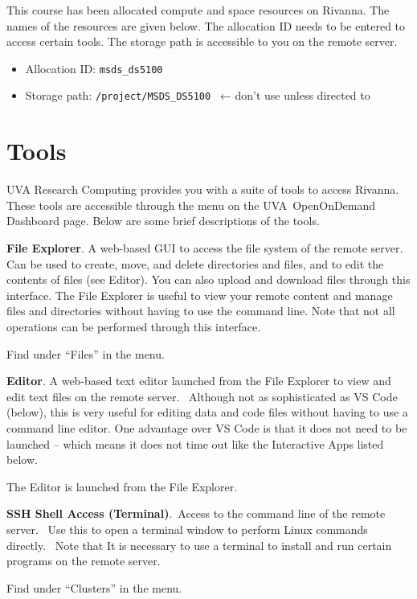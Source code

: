 \documentclass[
  letterpaper,
  DIV=11,
  numbers=noendperiod]{scrreport}
\providecommand{\tightlist}{%
  \setlength{\itemsep}{0pt}\setlength{\parskip}{0pt}}\usepackage{longtable,booktabs,array}
\begin{document}
This course has been allocated compute and space resources on Rivanna.
The names of the resources are given below. The allocation ID needs to
be entered to access certain tools. The storage path is accessible to
you on the remote server.

\begin{itemize}
\tightlist
\item
  Allocation ID: \texttt{msds\_ds5100}
\item
  Storage path: \texttt{/project/MSDS\_DS5100}~ ← don't use unless
  directed to
\end{itemize}

\hypertarget{tools}{%
\section{Tools~}\label{tools}}

UVA Research Computing provides you with a suite of tools to access
Rivanna. These tools are accessible through the menu on the
UVA~OpenOnDemand Dashboard page. Below are some brief descriptions of
the tools.

\textbf{File Explorer}. A web-based GUI to access the file system of the
remote server. Can be used to create, move, and delete directories and
files, and to edit the contents of files (see Editor). You can also
upload and download files through this interface. The File Explorer is
useful to view your remote content and manage files and directories
without having to use the command line. Note that not all operations can
be performed through this interface.

Find under ``Files'' in the menu.~

\textbf{Editor}. A web-based text editor launched from the File Explorer
to view and edit text files on the remote server.~ Although not as
sophisticated as VS Code (below), this is very useful for editing data
and code files without having to use a command line editor. One
advantage over VS Code is that it does not need to be launched -- which
means it does not time out like the Interactive Apps listed below.

The Editor is launched from the File Explorer.

\textbf{SSH Shell Access (Terminal)}.~Access to the command line of the
remote server.~ Use this to open a terminal window to perform Linux
commands directly.~ Note that It is necessary to use a terminal to
install and run certain programs on the remote server.

Find under ``Clusters'' in the menu.~
\end{document}
